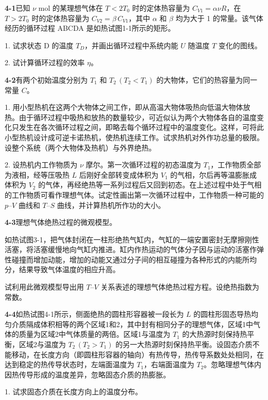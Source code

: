 \textbf{4-1}\quad 已知 $\nu$ mol 的某理想气体在 $T < 2T_{0}$ 时的定体热容量为 $C_{V1} = \alpha \nu R$，在 $T > 2T_{0}$ 时的定体热容量为 $C_{V2} = \beta\, C_{V1}$，其中 $\alpha$ 和 $\beta$ 均为大于 1 的常量。该气体经历的循环过程 ABCDA 是如热试图1-1所示的矩形。


1. 试求状态 D 的温度 $T_{D}$，并画出循环过程中系统内能 $U$ 随温度 $T$ 变化的图线。

2. 试计算循环过程的效率 $\eta$。
\vfill

\newpage
\textbf{4-2}\quad 有两个初始温度分别为 $T_{1}$ 和 $T_{2}\,(T_{2} < T_{1})$ 的大物体，它们的热容量为同一常量 $C$。


1. 用小型热机在这两个大物体之间工作，即从高温大物体吸热向低温大物体放热。由于循环过程中吸热和放热的数量较少，可近似认为两个大物体各自的温度变化只发生在各次循环过程之间，即略去每个循环过程中的温度变化。这样，可将此小型热机设计成可逆卡诺热机，使热机连续工作。试求热机对外作功总量的极限。设整个系统（两个大物体及热机）与外界绝热。

2. 设热机内工作物质为 $\nu$ 摩尔。第一次循环过程的初态温度为 $T_{1}$，工作物质全部为液相，经等压吸热 $L$ 后刚好全部转变成体积为 $V_{1}$ 的气相，尔后再等温膨胀成体积为 $V_{2}$ 的气体，再经绝热等一系列过程后又回到初态。在上述过程中处于气相的工作物质可看作理想气体。试定性画出第一次循环过程中，工作物质一种可能的 $p$--$V$ 曲线和 $T$--$S$ 曲线，并计算热机所作功的大小。
\vfill

\textbf{4-3}\quad 理想气体绝热过程的微观模型。

如热试图3-1，把气体封闭在一柱形绝热气缸内，气缸的一端安置密封无摩擦刚性活塞，将活塞缓慢地向气缸内推进。缸内作热运动的气体分子因与运动的活塞作弹性碰撞而增加动能，增加的动能又通过分子间的相互碰撞为各种形式的内能所均分，结果导致气体温度的相应升高。

试利用此微观模型导出用 $T$--$V$ 关系表述的理想气体绝热过程方程。设绝热指数为常数。
\vfill

\newpage
\textbf{4-4}\quad 如热试图4-1所示，侧面绝热的圆柱形容器被一段长为 $L$ 的圆柱形固态导热均匀介质隔成体积相等的两个区域1和2，其中封有相同分子的理想气体，区域1中气体的质量为区域2中气体质量的两倍。区域1与温度为 $T_{1}$ 的大热源时刻保持热平衡，区域2与温度为 $T_{2}\,(T_{2} > T_{1})$ 的另一大热源时刻保持热平衡。设固态介质不能移动，在长度方向（即圆柱形容器的轴向）有热传导，热传导系数处处相同，在达到稳定的热传导状态时，左端面温度为 $T_{1}$，右端面温度为 $T_{2}$。忽略理想气体内因热传导形成的温度差异，忽略固态介质的热膨胀。


1. 试求固态介质在长度方向上的温度分布。

